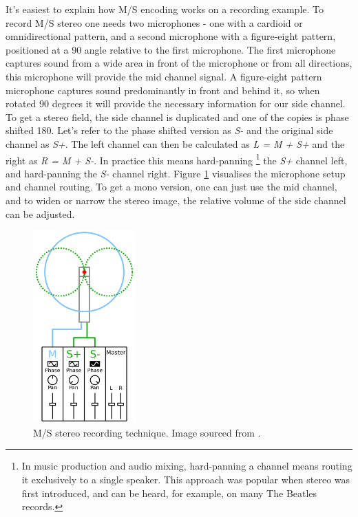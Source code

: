 It's easiest to explain how M/S encoding works on a recording example.
To record M/S stereo one needs two microphones - one with a cardioid or omnidirectional pattern,
and a second microphone with a figure-eight pattern, positioned at a 90\degree{} angle relative to the first microphone. 
The first microphone captures sound from a wide area in front of the microphone or from all directions, this microphone will provide the mid channel signal.
A figure-eight pattern microphone captures sound predominantly in front and behind it,
so when rotated 90 degrees it will provide the necessary information for our side channel.
To get a stereo field, the side channel is duplicated and one of the copies is phase shifted 180\degree{}.
Let's refer to the phase shifted version as \emph{S-} and the original side channel as \emph{S+}.
The left channel can then be calculated as \emph{L = M + S+} and the right as \emph{R = M + S-}. 
In practice this means hard-panning
\footnote{In music production and audio mixing, hard-panning a channel means routing it exclusively to a single speaker.
    This approach was popular when stereo was first introduced, and can be heard, for example, on many The Beatles records.}
the \emph{S+} channel left, and hard-panning the \emph{S-} channel right.
Figure \ref{fig:ms_stereo} visualises the microphone setup and channel routing.
To get a mono version, one can just use the mid channel, and to widen or narrow the stereo image,
the relative volume of the side channel can be adjusted. \cite{ms_recording_basics}\cite{new_realities_in_audio}\cite{ambisonics_practical_theory}


\begin{figure}
    \begin{center}
        \includegraphics[height=20em]{images/spatial_audio/ms_stereo}       
        \caption{M/S stereo recording technique. Image sourced from \cite{recording_practices_wiki}. \label{fig:ms_stereo}}    
    \end{center}
\end{figure}

